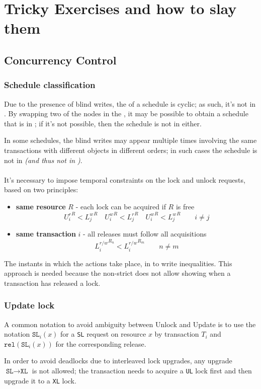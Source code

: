\documentclass[english]{article}
\begin{document}
\clearpage

\section{Tricky Exercises and how to slay them}

\subsection{Concurrency Control}

\subsubsection{Schedule classification}

Due to the presence of blind writes, the \CG of a schedule is cyclic;
as such, it's not in \CSR.
By swapping two of the nodes in the \CG, it may be possible to obtain a schedule that is in \VSR;
if it's not possible, then the schedule is not in \VSR either.

In some schedules, the blind writes may appear multiple times involving the same transactions with different objects in different orders;
in such cases the schedule is not in \CSR \textit{(and thus not in \VSR)}.

\paragraph{\TPL}

It's necessary to impose temporal constraints on the lock and unlock requests, based on two principles:

\begin{itemize}
  \item \textbf{same resource} \(R\) - each lock can be acquired if \(R\) is free
        \[ {U^r_i}^R < {L^w_j}^R \quad {U^w_i}^R < {L^r_j}^R \quad {U^w_i}^R < {L^w_j}^R \qquad i \neq j \]
  \item \textbf{same transaction} \(i\) - all releases must follow all acquisitions
        \[{L^{r/w}_i}^{R_n} < {L^{r/w}_i}^{R_m} \qquad n \neq m \]
\end{itemize}

The instants in which the actions take place, in to write inequalities.
This approach is needed because the non-strict \TPL does not allow showing when a transaction has released a lock.

\subsubsection{Update lock}

A common notation to avoid ambiguity between Unlock and Update is to use the notation \(\texttt{SL}_i(x)\) for a \texttt{SL} request on resource \(x\) by transaction \(T_i\) and \(\texttt{rel}(\texttt{SL}_i(x))\) for the corresponding release.

In order to avoid deadlocks due to interleaved lock upgrades, any upgrade \(\texttt{SL} \rightarrow \texttt{XL}\) is not allowed;
the transaction needs to acquire a \texttt{UL} lock first and then upgrade it to a \texttt{XL} lock.
\end{document}
